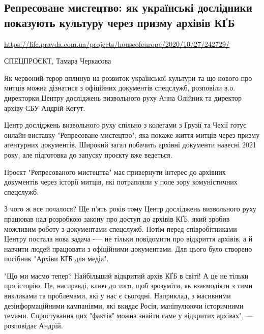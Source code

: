  


\subsection{Репресоване мистецтво: як українські дослідники показують культуру
через призму архівів КҐБ}

{\small
\vspace{0.5cm}
\url{https://life.pravda.com.ua/projects/houseofeurope/2020/10/27/242729/}
\vspace{0.5cm}
}

СПЕЦПРОЄКТ, Тамара Черкасова

Як червоний терор вплинув на розвиток української культури та що нового про
митців можна дізнатися з офіційних документів спецслужб, розповіли в.о.
директорки Центру досліджень визвольного руху Анна Олійник та директор архіву
СБУ Андрій Когут.

Центр досліджень визвольного руху спільно з колегами з Грузії та Чехії готує
онлайн-виставку "Репресоване мистецтво", яка покаже життя митців через призму
агентурних документів. Широкий загал побачить архівні документи навесні 2021
року, але підготовка до запуску проєкту вже ведеться.

Проєкт "Репресованого мистецтва" має привернути інтерес до архівних документів
через історії митців, які потрапляли у поле зору комуністичних спецслужб. 

З чого ж все почалося? Ще п'ять років тому Центр досліджень визвольного руху
працював над розробкою закону про доступ до архівів КҐБ, який зробив можливим
роботу з документами спецслужб. Потім перед співробітниками Центру постала нова
задача -— не тільки повідомити про відкриття архівів, а й навчити людей
працювати з офіційними документами. Для цього було створено посібник "Архіви
КҐБ для медіа".

"Що ми маємо тепер? Найбільший відкритий архів КҐБ в світі! А це не тільки про
історію. Це, насправді, ключ до того, щоб зрозуміти, як взаємодіяти з тими
викликами та проблемами, які у нас є сьогодні. Наприклад, з масивними
дезінформаційними кампаніями, які вкидає Росія, маніпулюючи історичними темами.
Спростування цих "фактів" можна знайти саме у відкритих архівах", --- розповідає
Андрій.

